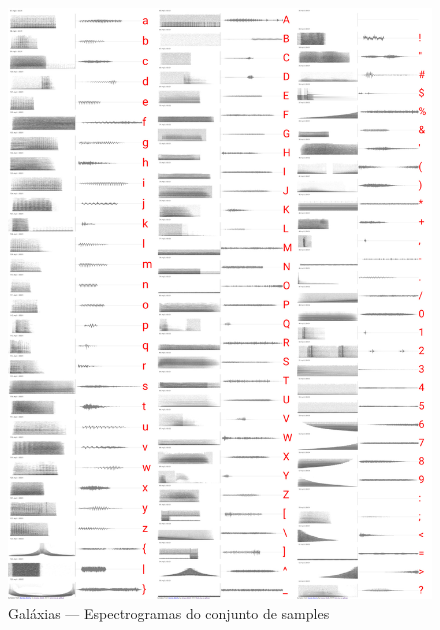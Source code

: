\begin{description}
\begin{figure}
    \caption{\label{samplesgalaxias}Galáxias --- Espectrogramas do conjunto de samples}
    \begin{center}
        \includegraphics[width=1\linewidth]{pictures/cap3/bandagalaxias.jpg}
    \end{center}
\end{figure}



\end{description}
